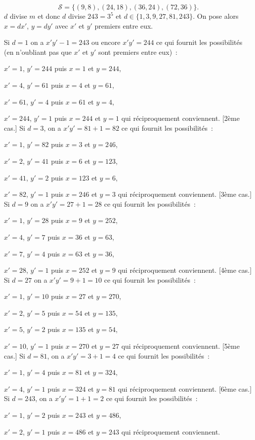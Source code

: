 {{$$\mathcal{S}=\{(9,8),(24,18),(36,24),(72,36)\}.$$
$d$ divise $m$ et donc $d$ divise $243=3^5$ et $d\in\{1,3,9,27,81,243\}$. On pose alors $x=dx'$, $y=dy'$ avec $x'$ et $y'$ premiers entre eux.

\begin{itemize}
[1er cas.] Si $d=1$ on a $x'y'-1=243$ ou encore $x'y'=244$ ce qui fournit les possibilités (en n'oubliant pas que $x'$ et $y'$ sont premiers entre eux)~:

$x'=1$, $y'=244$ puis $x=1$ et $y=244$, 

$x'=4$, $y'=61$ puis $x=4$ et $y=61$,

$x'=61$, $y'=4$ puis $x=61$ et $y=4$,
 
$x'=244$, $y'=1$ puis $x=244$ et $y=1$ qui réciproquement conviennent.
[2ème cas.] Si $d=3$, on a $x'y'=81+1=82$ ce qui fournit les possibilités~:

$x'=1$, $y'=82$ puis $x=3$ et $y=246$,
 
$x'=2$, $y'=41$ puis $x=6$ et $y=123$,

$x'=41$, $y'=2$ puis $x=123$ et $y=6$,
 
$x'=82$, $y'=1$ puis $x=246$ et $y=3$ qui réciproquement conviennent.
[3ème cas.] Si $d=9$ on a $x'y'=27+1=28$ ce qui fournit les possibilités~:

$x'=1$, $y'=28$ puis $x=9$ et $y=252$,
 
$x'=4$, $y'=7$ puis $x=36$ et $y=63$,

$x'=7$, $y'=4$ puis $x=63$ et $y=36$,
 
$x'=28$, $y'=1$ puis $x=252$ et $y=9$ qui réciproquement conviennent.
[4ème cas.] Si $d=27$ on a $x'y'=9+1=10$ ce qui fournit les possibilités~:

$x'=1$, $y'=10$ puis $x=27$ et $y=270$,
 
$x'=2$, $y'=5$ puis $x=54$ et $y=135$,

$x'=5$, $y'=2$ puis $x=135$ et $y=54$,
 
$x'=10$, $y'=1$ puis $x=270$ et $y=27$ qui réciproquement conviennent.
[5ème cas.] Si $d=81$, on a $x'y'=3+1=4$ ce qui fournit les possibilités~:

$x'=1$, $y'=4$ puis $x=81$ et $y=324$,
 
$x'=4$, $y'=1$ puis $x=324$ et $y=81$ qui réciproquement conviennent.
[6ème cas.] Si $d=243$, on a $x'y'=1+1=2$ ce qui fournit les possibilités~:

$x'=1$, $y'=2$ puis $x=243$ et $y=486$,
 
$x'=2$, $y'=1$ puis $x=486$ et $y=243$ qui réciproquement conviennent.
\end{itemize}
}
}
